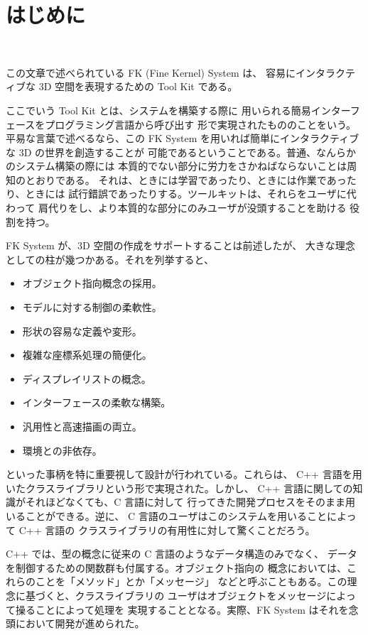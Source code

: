 \chapter*{はじめに}
~

この文章で述べられている FK (Fine Kernel)  System は、
容易にインタラクティブな 3D 空間を表現するための Tool Kit である。

ここでいう Tool Kit とは、システムを構築する際に
用いられる簡易インターフェースをプログラミング言語から呼び出す
形で実現されたもののことをいう。平易な言葉で述べるなら、この
FK System を用いれば簡単にインタラクティブな 3D の世界を創造することが
可能であるということである。普通、なんらかのシステム構築の際には
本質的でない部分に労力をさかねばならないことは周知のとおりである。
それは、ときには学習であったり、ときには作業であったり、ときには
試行錯誤であったりする。ツールキットは、それらをユーザに代わって
肩代りをし、より本質的な部分にのみユーザが没頭することを助ける
役割を持つ。

FK System が、3D 空間の作成をサポートすることは前述したが、
大きな理念としての柱が幾つかある。それを列挙すると、
\begin{itemize}
 \item オブジェクト指向概念の採用。
 \item モデルに対する制御の柔軟性。
 \item 形状の容易な定義や変形。
 \item 複雑な座標系処理の簡便化。
 \item ディスプレイリストの概念。
 \item インターフェースの柔軟な構築。
 \item 汎用性と高速描画の両立。
 \item 環境との非依存。
\end{itemize}
といった事柄を特に重要視して設計が行われている。これらは、
C++ 言語を用いたクラスライブラリという形で実現された。しかし、
C++ 言語に関しての知識がそれほどなくても、C 言語に対して
行ってきた開発プロセスをそのまま用いることができる。逆に、
C 言語のユーザはこのシステムを用いることによって C++ 言語の
クラスライブラリの有用性に対して驚くことだろう。

C++ では、型の概念に従来の C 言語のようなデータ構造のみでなく、
データを制御するための関数群も付属する。オブジェクト指向の
概念においては、これらのことを「メソッド」とか「メッセージ」
などと呼ぶこともある。この理念に基づくと、クラスライブラリの
ユーザはオブジェクトをメッセージによって操ることによって処理を
実現することとなる。実際、FK System はそれを念頭において開発が進められた。


